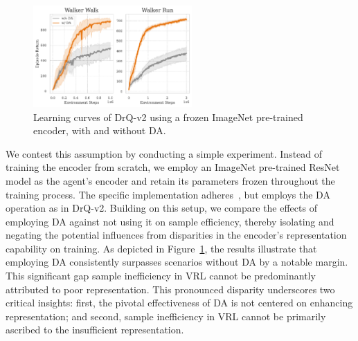 \begin{figure}
  \vspace{-\baselineskip}  
  \includegraphics[width=0.54\textwidth]{Figures/2Modules/pre-trained_encoder.pdf}
  \vspace{-2\baselineskip}
  \caption{Learning curves of DrQ-v2 using a frozen ImageNet pre-trained encoder, with and without DA.}
  \label{fig:pretrain}
\end{figure}
We contest this assumption by conducting a simple experiment.
Instead of training the encoder from scratch, we employ an ImageNet pre-trained ResNet model as the agent's encoder and retain its parameters frozen throughout the training process.
The specific implementation adheres~\cite{yuan2022pre}, but employs the DA operation as in DrQ-v2.
Building on this setup, we compare the effects of employing DA against not using it on sample efficiency, thereby isolating and negating the potential influences from disparities in the encoder's representation capability on training.
As depicted in Figure~\ref{fig:pretrain}, the results illustrate that employing DA consistently surpasses scenarios without DA by a notable margin.
This significant gap sample inefficiency in VRL cannot be predominantly attributed to poor representation.
This pronounced disparity underscores two critical insights: first, the pivotal effectiveness of DA is not centered on enhancing representation; and second, sample inefficiency in VRL cannot be primarily ascribed to the insufficient representation.


